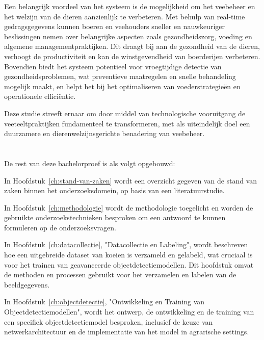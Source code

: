 Een belangrijk voordeel van het systeem is de mogelijkheid om het veebeheer en het welzijn van de dieren aanzienlijk te verbeteren. Met behulp van real-time gedragsgegevens kunnen boeren en veehouders sneller en nauwkeuriger beslissingen nemen over belangrijke aspecten zoals gezondheidszorg, voeding en algemene managementpraktijken. Dit draagt bij aan de gezondheid van de dieren, verhoogt de productiviteit en kan de winstgevendheid van boerderijen verbeteren. Bovendien biedt het systeem potentieel voor vroegtijdige detectie van gezondheidsproblemen, wat preventieve maatregelen en snelle behandeling mogelijk maakt, en helpt het bij het optimaliseren van voederstrategieën en operationele efficiëntie.

Deze studie streeft ernaar om door middel van technologische vooruitgang de veeteeltpraktijken fundamenteel te transformeren, met als uiteindelijk doel een duurzamere en dierenwelzijnsgerichte benadering van veebeheer.
\section{}%
\label{sec:opzet-bachelorproef}


De rest van deze bachelorproef is als volgt opgebouwd:

In Hoofdstuk~\ref{ch:stand-van-zaken} wordt een overzicht gegeven van de stand van zaken binnen het onderzoeksdomein, op basis van een literatuurstudie.

In Hoofdstuk~\ref{ch:methodologie} wordt de methodologie toegelicht en worden de gebruikte onderzoekstechnieken besproken om een antwoord te kunnen formuleren op de onderzoeksvragen.

In Hoofdstuk~\ref{ch:datacollectie}, "Datacollectie en Labeling", wordt beschreven hoe een uitgebreide dataset van koeien is verzameld en gelabeld, wat cruciaal is voor het trainen van geavanceerde objectdetectiemodellen. Dit hoofdstuk omvat de methoden en processen gebruikt voor het verzamelen en labelen van de beeldgegevens.

In Hoofdstuk~\ref{ch:objectdetectie}, "Ontwikkeling en Training van Objectdetectiemodellen", wordt het ontwerp, de ontwikkeling en de training van een specifiek objectdetectiemodel besproken, inclusief de keuze van netwerkarchitectuur en de implementatie van het model in agrarische settings.

